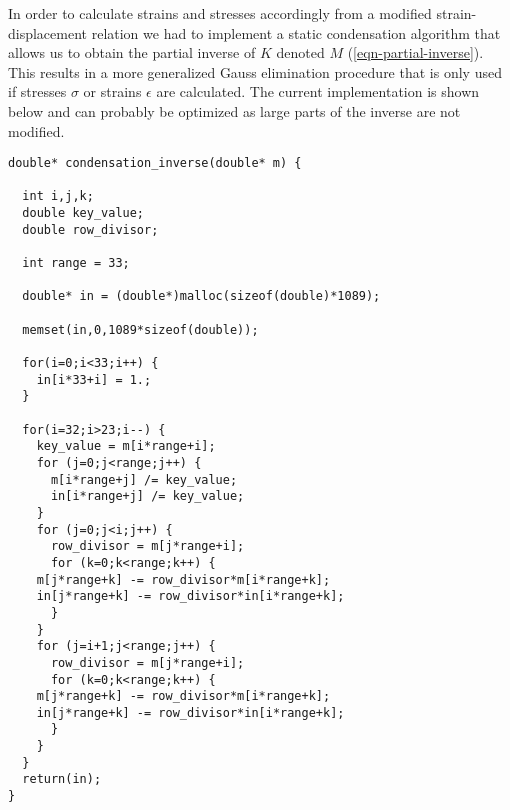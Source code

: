 In order to calculate strains and stresses accordingly from a modified
strain-displacement relation we had to implement a static condensation
algorithm that allows us to obtain the partial inverse of $K$ denoted
$M$ (\ref{eqn-partial-inverse}). This results in a more generalized
Gauss elimination procedure that is only used if stresses $\sigma$
or strains $\epsilon$ are calculated. The current implementation is
shown below and can probably be optimized as large parts of the
inverse are not modified.  
\begin{lstlisting}
double* condensation_inverse(double* m) {

  int i,j,k;
  double key_value;
  double row_divisor;

  int range = 33;
    
  double* in = (double*)malloc(sizeof(double)*1089);

  memset(in,0,1089*sizeof(double));
    
  for(i=0;i<33;i++) {
    in[i*33+i] = 1.;
  }
  
  for(i=32;i>23;i--) {
    key_value = m[i*range+i];
    for (j=0;j<range;j++) {
      m[i*range+j] /= key_value;
      in[i*range+j] /= key_value;
    }
    for (j=0;j<i;j++) {
      row_divisor = m[j*range+i];
      for (k=0;k<range;k++) {
	m[j*range+k] -= row_divisor*m[i*range+k];
	in[j*range+k] -= row_divisor*in[i*range+k];
      }
    }
    for (j=i+1;j<range;j++) {
      row_divisor = m[j*range+i];
      for (k=0;k<range;k++) {
	m[j*range+k] -= row_divisor*m[i*range+k];
	in[j*range+k] -= row_divisor*in[i*range+k];
      }
    }
  }
  return(in);
}
\end{lstlisting}

